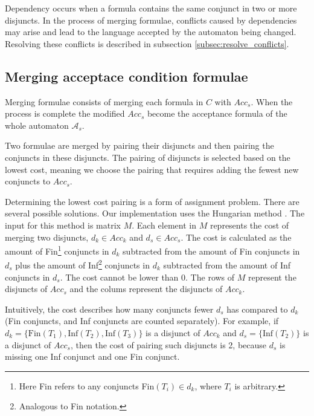 \documentclass[
  digital, %
  twoside, %
  table,   %
  lof,     %
  lot,     %
]{fithesis3}
\begin{document}
Dependency occurs when a formula contains the same conjunct in two or more disjuncts. In the process of merging formulae, conflicts caused by dependencies may arise and lead to the language accepted by the automaton being changed. Resolving these conflicts is described in subsection \ref{subsec:resolve_conflicts}. 

\subsection{Merging acceptace condition formulae}
Merging formulae consists of merging each formula in $C$ with $Acc_s$. When the process is complete the modified $Acc_s$ become the acceptance formula of the whole automaton $\mathcal{A}_s$.

Two formulae are merged by pairing their disjuncts and then pairing the conjuncts in these disjuncts. The pairing of disjuncts is selected based on the lowest cost, meaning we choose the pairing that requires adding the fewest new conjuncts to $Acc_s$. 

Determining the lowest cost pairing is a form of assignment problem. There are several possible solutions. Our implementation uses the Hungarian method \cite{hungarian_method}. The input for this method is matrix $M$. Each element in $M$ represents the cost of merging two disjuncts, $d_k \in Acc_k$ and $d_s \in Acc_s$. The cost is calculated as the amount of Fin\footnote{Here Fin refers to any conjuncts Fin$(T_i) \in d_k$, where $T_i$ is arbitrary.} conjuncts in $d_k$ subtracted from the amount of Fin conjuncts in $d_s$ plus the amount of Inf\footnote{Analogous to Fin notation.} conjuncts in $d_k$ subtracted from the amount of Inf conjuncts in $d_s$. The cost cannot be lower than 0. The rows of $M$ represent the disjuncts of $Acc_s$ and the colums represent the disjuncts of $Acc_k$.

Intuitively, the cost describes how many conjuncts fewer $d_s$ has compared to $d_k$ (Fin conjuncts, and Inf conjuncts are counted separately). For example, if $d_k = \{\text{Fin}(T_1), \text{Inf}(T_2), \text{Inf}(T_3)\}$ is a disjunct of $Acc_k$ and $d_s = \{\text{Inf}(T_2)\}$ is a disjunct of $Acc_s$, then the cost of pairing such disjuncts is 2, because $d_s$ is missing one Inf conjunct and one Fin conjunct. 
\end{document}
